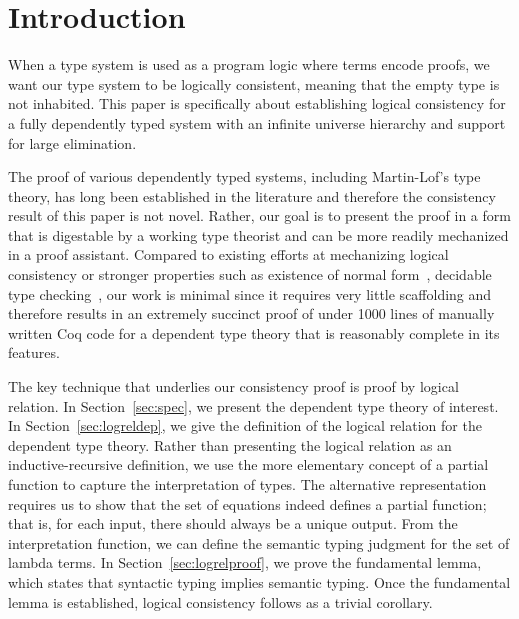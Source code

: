 \documentclass[nonacm]{acmart}
\begin{document}
\section{Introduction}
When a type system is used as a program logic where terms encode proofs, we
want our type system to be logically consistent, meaning
that the empty type is not inhabited.
This paper is specifically
about establishing logical consistency for a fully dependently typed
system with an infinite universe hierarchy and support for large
elimination. %

The proof of various dependently typed systems, including Martin-Lof's
type theory, has long been
established in the literature and therefore the consistency result of
this paper is not novel. Rather,
our goal is to present the proof in a form that is digestable by a
working type theorist and can be more readily mechanized in a proof
assistant. Compared to existing efforts at mechanizing logical
consistency or stronger properties such as existence of normal
form~\citep{nbeincoq},
decidable type checking~\citep{decagda}, our work is minimal since it requires very
little scaffolding and therefore results in an extremely succinct
proof of under 1000 lines of manually written Coq code for a dependent
type theory that is reasonably complete in its features.

The key technique that underlies our consistency proof is proof by
logical relation. In
Section~\ref{sec:spec}, we present the dependent type theory of
interest. In Section~\ref{sec:logreldep}, we give the definition
of the logical relation for the dependent type theory. Rather than
presenting the logical relation as an inductive-recursive definition,
we use the more elementary concept of a partial function to capture
the interpretation of types. The alternative representation requires us
to show that the set of equations indeed defines a partial function;
that is, for each input, there should always be a unique
output.
From the interpretation function, we can define the semantic
typing judgment for the set of lambda terms.
In Section~\ref{sec:logrelproof}, we prove the fundamental lemma,
which states that syntactic typing implies semantic typing. Once the
fundamental lemma is established, logical consistency follows as a
trivial corollary.
\end{document}
